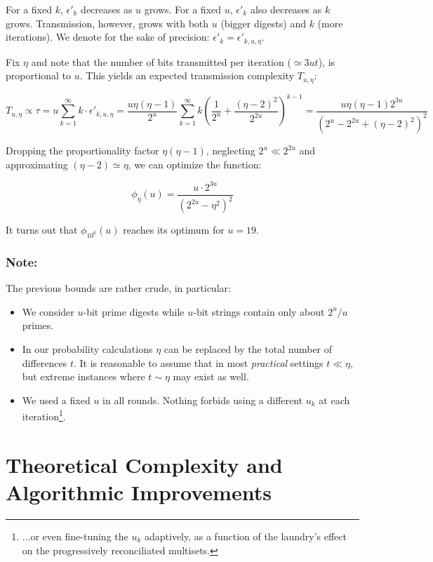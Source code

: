 \documentclass[11pt]{llncs}
\begin{document}
For a fixed $k$, $\epsilon'_k$ decreases as $u$ grows. For a fixed $u$, $\epsilon'_k$ also decreases as $k$ grows. Transmission, however, grows with both $u$ (bigger digests) and $k$ (more iterations). We denote for the sake of precision: $\epsilon'_k = \epsilon'_{k,u,\eta}$.\smallskip
 
Fix $\eta$ and note that the number of bits transmitted per iteration ($\simeq 3ut$), is proportional to $u$. This yields an expected transmission complexity $T_{u,\eta}$:\smallskip

\[T_{u,\eta} \propto \tau = u \sum_{k=1}^{\infty} k \cdot \epsilon'_{k,u,\eta}=
\frac{u \eta(\eta-1)}{2^u} \sum_{k=1}^{\infty} k \left( \frac{1}{2^u} + \frac{(\eta-2)^2}{2^{2u}} \right)^{k-1}=
\frac{u \eta(\eta-1) 2^{3u}}{(2^u-2^{2u}+(\eta-2)^2)^2}\]

Dropping the proportionality factor $\eta(\eta-1)$, neglecting $2^u \ll 2^{2u}$ and approximating $(\eta-2)\simeq\eta$, we can optimize the function:

\[
\phi_\eta(u)=\frac{u \cdot 2^{3u}}{(2^{2u}-\eta^2)^2} 
\]

It turns out that $\phi_{10^6}(u)$ reaches its optimum for $u=19$.

\subsubsection{Note:} The previous bounds are rather crude, in particular:

\begin{itemize}
\item We consider $u$-bit prime digests while $u$-bit strings contain only about $2^u/u$ primes.\smallskip

\item In our probability calculations $\eta$ can be replaced by the total number of differences $t$. It is reasonable to assume that in most {\sl practical} settings $t \ll \eta$, but extreme instances where $t\sim\eta$ may exist as well.\smallskip

\item We used a fixed $u$ in all rounds. Nothing forbids using a different $u_k$ at each iteration\footnote{...or even fine-tuning the $u_k$ adaptively, as a function of the laundry's effect on the progressively reconciliated multisets.}.
\end{itemize}

\section{Theoretical Complexity and Algorithmic Improvements}
\end{document}
